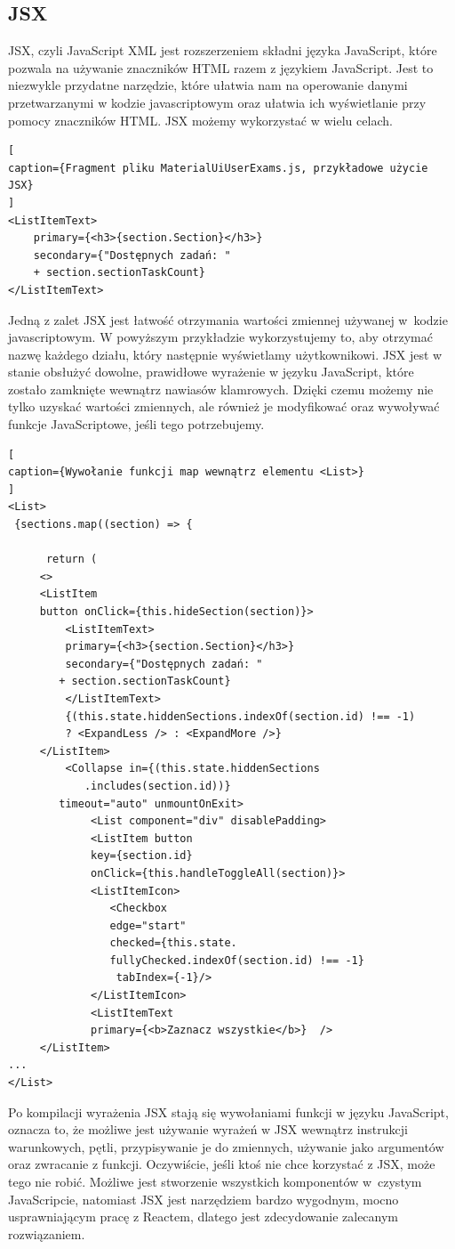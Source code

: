 \documentclass[oneside,polski,logo,indent]{amuthesis}
\begin{document}
\subsection{JSX}
{
JSX, czyli JavaScript XML jest rozszerzeniem składni języka JavaScript, które pozwala na używanie znaczników HTML razem z językiem JavaScript. Jest to niezwykle przydatne narzędzie, które ułatwia nam na operowanie danymi przetwarzanymi w kodzie javascriptowym oraz ułatwia ich wyświetlanie przy pomocy znaczników HTML. JSX możemy wykorzystać w wielu celach.
\begin{lstlisting}[
caption={Fragment pliku MaterialUiUserExams.js, przykładowe użycie JSX}
]
<ListItemText>
	primary={<h3>{section.Section}</h3>}
	secondary={"Dostępnych zadań: " 
	+ section.sectionTaskCount}
</ListItemText>
\end{lstlisting}
Jedną z zalet JSX jest łatwość otrzymania wartości zmiennej używanej w~kodzie javascriptowym. W powyższym przykładzie wykorzystujemy to, aby otrzymać nazwę każdego działu, który następnie wyświetlamy użytkownikowi.
JSX jest w stanie obsłużyć dowolne, prawidłowe wyrażenie w języku JavaScript, które zostało zamknięte wewnątrz nawiasów klamrowych. Dzięki czemu możemy nie tylko uzyskać wartości zmiennych, ale również je modyfikować oraz wywoływać funkcje JavaScriptowe, jeśli tego potrzebujemy.
\begin{lstlisting}[
caption={Wywołanie funkcji map wewnątrz elementu <List>}
]
<List>
 {sections.map((section) => {
                     
	  return (
	 <>
	 <ListItem
	 button onClick={this.hideSection(section)}>
		 <ListItemText>
		 primary={<h3>{section.Section}</h3>}
		 secondary={"Dostępnych zadań: " 
		+ section.sectionTaskCount}
		 </ListItemText>
		 {(this.state.hiddenSections.indexOf(section.id) !== -1)
		 ? <ExpandLess /> : <ExpandMore />}
	 </ListItem>
		 <Collapse in={(this.state.hiddenSections
			.includes(section.id))} 
		timeout="auto" unmountOnExit>
			 <List component="div" disablePadding>
			 <ListItem button
			 key={section.id}
			 onClick={this.handleToggleAll(section)}>
			 <ListItemIcon>
			 	<Checkbox
			 	edge="start"
			 	checked={this.state.
				fullyChecked.indexOf(section.id) !== -1}
				 tabIndex={-1}/>
			 </ListItemIcon>
			 <ListItemText 
			 primary={<b>Zaznacz wszystkie</b>}  />
	 </ListItem>
...
</List>
\end{lstlisting}
Po kompilacji wyrażenia JSX stają się wywołaniami funkcji w języku JavaScript, oznacza to, że możliwe jest używanie wyrażeń w JSX wewnątrz instrukcji warunkowych, pętli, przypisywanie je do zmiennych, używanie jako argumentów oraz zwracanie z funkcji.
Oczywiście, jeśli ktoś nie chce korzystać z JSX, może tego nie robić. Możliwe jest stworzenie wszystkich komponentów w~czystym JavaScripcie, natomiast JSX jest narzędziem bardzo wygodnym, mocno usprawniającym pracę z Reactem, dlatego jest zdecydowanie zalecanym rozwiązaniem.
}
\end{document}
